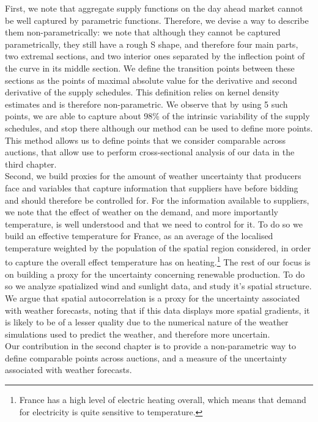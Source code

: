 First, we note that aggregate supply functions on the day ahead market cannot be well captured by parametric functions. Therefore, we devise a way to describe them non-parametrically: we note that although they cannot be captured parametrically, they still have a rough S shape, and therefore four main parts, two extremal sections, and two interior ones separated by the inflection point of the curve in its middle section. We define the transition points between these sections as the points of maximal absolute value for the derivative and second derivative of the supply schedules. This definition relies on kernel density estimates and is therefore non-parametric. We observe that by using 5 such points, we are able to capture about 98\% of the intrinsic variability of the supply schedules, and stop there although our method can be used to define more points. This method allows us to define points that we consider comparable across auctions, that allow use to perform cross-sectional analysis of our data in the third chapter. \\

Second, we build proxies for the amount of weather uncertainty that producers face and variables that capture information that suppliers have before bidding and should therefore be controlled for. For the information available to suppliers, we note that the effect of weather on the demand, and more importantly temperature, is well understood and that we need to control for it. To do so we build an effective temperature for France, as an average of the localised temperature weighted by the population of the spatial region considered, in order to capture the overall effect temperature has on heating.\footnote{France has a high level of electric heating overall, which means that demand for electricity is quite sensitive to temperature.} The rest of our focus is on building a proxy for the uncertainty concerning renewable production. To do so we analyze spatialized wind and sunlight data, and study it's spatial structure. We argue that spatial autocorrelation is a proxy for the uncertainty associated with weather forecasts, noting that if this data displays more spatial gradients, it is likely to be of a lesser quality due to the numerical nature of the weather simulations used to predict the weather, and therefore more uncertain.\\

Our contribution in the second chapter is to provide a non-parametric way to define comparable points across auctions, and a measure of the uncertainty associated with weather forecasts.\\

